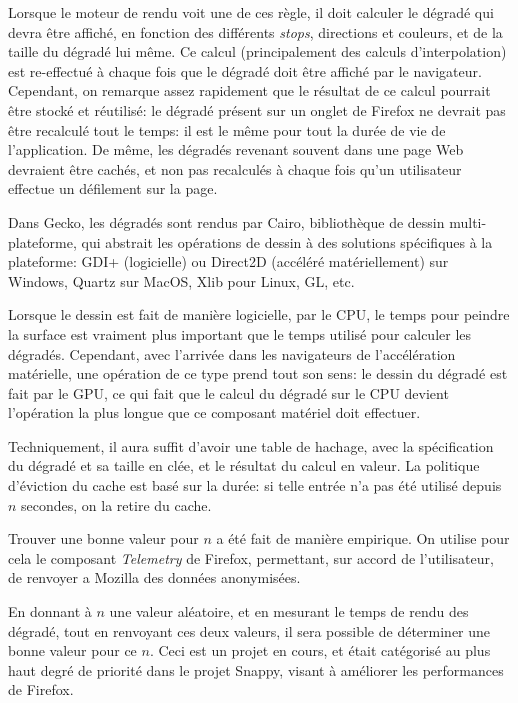 \documentclass[a4paper,10pt]{article}
\begin{document}
\begin{multicols}{2}
  Lorsque le moteur de rendu voit une de ces règle, il doit calculer le dégradé
  qui devra être affiché, en fonction des différents \emph{stops}, directions et
  couleurs, et de la taille du dégradé lui même. Ce calcul (principalement des
  calculs d'interpolation) est re-effectué à chaque fois que le dégradé doit
  être affiché par le navigateur. Cependant, on remarque assez rapidement que le
  résultat de ce calcul pourrait être stocké et réutilisé: le dégradé présent
  sur un onglet de Firefox ne devrait pas être recalculé tout le temps: il est
  le même pour tout la durée de vie de l'application. De même, les dégradés
  revenant souvent dans une page Web devraient être cachés, et non pas
  recalculés à chaque fois qu'un utilisateur effectue un défilement sur la page.

  Dans Gecko, les dégradés sont rendus par Cairo, bibliothèque de dessin
  multi-plateforme, qui abstrait les opérations de dessin à des solutions
  spécifiques à la plateforme: GDI+ (logicielle) ou Direct2D (accéléré
  matériellement) sur Windows, Quartz sur MacOS, Xlib pour Linux, GL, etc.

  Lorsque le dessin est fait de manière logicielle, par le CPU, le temps pour
  peindre la surface est vraiment plus important que le temps utilisé pour
  calculer les dégradés. Cependant, avec l'arrivée dans les navigateurs de
  l'accélération matérielle, une opération de ce type prend tout son sens: le
  dessin du dégradé est fait par le GPU, ce qui fait que le calcul du dégradé
  sur le CPU devient l'opération la plus longue que ce composant matériel doit
  effectuer.

  Techniquement, il aura suffit d'avoir une table de hachage, avec la
  spécification du dégradé et sa taille en clée, et le résultat du calcul en
  valeur. La politique d'éviction du cache est basé sur la durée: si telle
  entrée n'a pas été utilisé depuis $n$ secondes, on la retire du cache.

  Trouver une bonne valeur pour $n$ a été fait de manière empirique. On utilise
  pour cela le composant \emph{Telemetry} de Firefox, permettant, sur accord de
  l'utilisateur, de renvoyer a Mozilla des données anonymisées.

  En donnant à $n$ une valeur aléatoire, et en mesurant le temps de rendu des
  dégradé, tout en renvoyant ces deux valeurs, il sera possible de déterminer
  une bonne valeur pour ce $n$. Ceci est un projet en cours, et était catégorisé
  au plus haut degré de priorité dans le projet Snappy, visant à améliorer les
  performances de Firefox.


\end{multicols}
\end{document}
